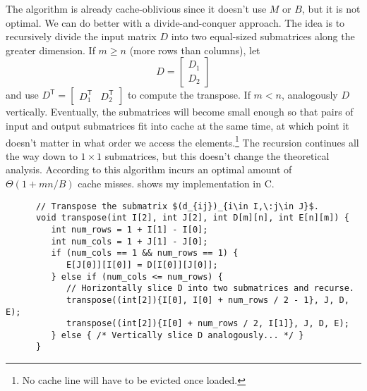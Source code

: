 The algorithm is  already cache-oblivious since it
doesn't use \(M\) or \(B\), but it is not optimal.  We can do better
with a divide-and-conquer approach.  The idea is to recursively divide the input matrix
\(D\) into two equal-sized submatrices along the greater dimension.  If \(m \geq n\) (more
rows than columns), let
\begin{equation*}
   D = \begin{bmatrix}
      D_1\\
      D_2
   \end{bmatrix}
\end{equation*}
and use \(D^\mathsf{T} = \begin{bmatrix} D_1^\mathsf{T} & D_2^\mathsf{T} \end{bmatrix}\)
to compute the transpose.  If \(m < n\), analogously  \(D\) vertically.
Eventually, the submatrices will become small enough so that pairs of input and output
submatrices fit into cache at the same time, at which point it doesn't matter in what
order we access the elements.\footnote{%
   No cache line will have to be evicted once loaded.
}
The recursion continues all the way down to \(1 \times 1\) submatrices, but this doesn't
change the theoretical analysis.  According to
\textcite[theorem 2 and 3, \ppno~19--21]{coa-thesis}
this algorithm incurs an optimal amount of \(\Theta(1 + mn / B)\) cache misses.
 shows my implementation in C.

\begin{center}
   \begin{verbatim}
      // Transpose the submatrix $(d_{ij})_{i\in I,\:j\in J}$.
      void transpose(int I[2], int J[2], int D[m][n], int E[n][m]) {
         int num_rows = 1 + I[1] - I[0];
         int num_cols = 1 + J[1] - J[0];
         if (num_cols == 1 && num_rows == 1) {
            E[J[0]][I[0]] = D[I[0]][J[0]];
         } else if (num_cols <= num_rows) {
            // Horizontally slice D into two submatrices and recurse.
            transpose((int[2]){I[0], I[0] + num_rows / 2 - 1}, J, D, E);
            transpose((int[2]){I[0] + num_rows / 2, I[1]}, J, D, E);
         } else { /* Vertically slice D analogously... */ }
      }
   \end{verbatim}
   \label{lst:xpose}
\end{center}

